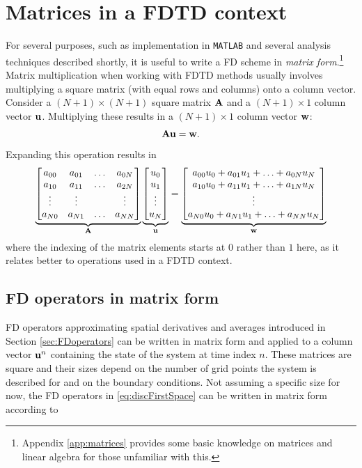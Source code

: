 \section{Matrices in a FDTD context}\label{sec:matricesFDTD}
For several purposes, such as implementation in \texttt{MATLAB} and several analysis techniques described shortly, it is useful to write a FD scheme in \textit{matrix form}.\footnote{Appendix \ref{app:matrices} provides some basic knowledge on matrices and linear algebra for those unfamiliar with this.} Matrix multiplication when working with FDTD methods usually involves multiplying a square matrix (with equal rows and columns) onto a column vector. Consider a $(N+1)\times (N+1)$ square matrix $\mathbf{A}$ and a $(N+1) \times 1$ column vector $\mathbf{u}$. Multiplying these results in a $(N+1) \times 1$ column vector $\mathbf{w}$:
\begin{equation}
    \mathbf{A}\mathbf{u} = \mathbf{w}.
\end{equation}
Expanding this operation results in
\begin{equation}
    \underbrace{\begin{bmatrix}
        a_{00} & a_{01} & \hdots & a_{0N}\\
        a_{10} & a_{11} & \hdots & a_{2N}\\
        \vdots & \vdots & &\vdots\\
        a_{N0} & a_{N1} & \hdots & a_{NN}
    \end{bmatrix}}_{\mathbf{A}}
    \underbrace{\begin{bmatrix}
        u_0\\
        u_1\\
        \vdots\\
        u_N
    \end{bmatrix}}_{\mathbf{u}} = 
    \underbrace{\begin{bmatrix}
        a_{00}u_0 + a_{01}u_1 + \hdots + a_{0N}u_N\\
        a_{10}u_0 + a_{11}u_1 + \hdots + a_{1N}u_N\\
        \vdots\\
        a_{N0}u_0 + a_{N1}u_1 + \hdots + a_{NN}u_N
    \end{bmatrix}}_{\mathbf{w}}
\end{equation}
where the indexing of the matrix elements starts at $0$ rather than $1$ here, as it relates better to operations used in a FDTD context.

\subsection{FD operators in matrix form}
FD operators approximating spatial derivatives and averages introduced in Section \ref{sec:FDoperators} can be written in matrix form and applied to a column vector $\mathbf{u}^n$ containing the state of the system at time index $n$. These matrices are square and their sizes depend on the number of grid points the system is described for and on the boundary conditions. Not assuming a specific size for now, the FD operators in \eqref{eq:discFirstSpace} can be written in matrix form according to
\setstacktabbedgap{4pt}
\def\lrgap{\kern3pt}

